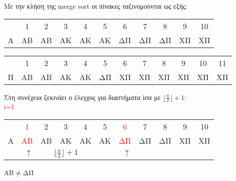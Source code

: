 \documentclass[a4paper]{article}
\begin{document}
\begin{itemize}
Με την κλήση της merge sort οι πίνακες ταξινομούνται ως εξής:
\begin{center}
\begin{tabular}{r|c|c|c|c|c|c|c|c|c|c|}
\multicolumn{1}{r}{} & \multicolumn{1}{c}{1} & \multicolumn{1}{c}{2} & \multicolumn{1}{c}{3} & \multicolumn{1}{c}{4} & \multicolumn{1}{c}{5} & \multicolumn{1}{c}{6} & \multicolumn{1}{c}{7} & \multicolumn{1}{c}{8} & \multicolumn{1}{c}{9} & \multicolumn{1}{c}{10}\\
\cline{2-11}
 Α& ΑΒ & ΑΒ & ΑΚ & ΑΚ & ΑΚ & ΔΠ & ΔΠ & ΔΠ & ΧΠ & ΧΠ\\
\cline{2-11}
\end{tabular}
\begin{tabular}{r|c|c|c|c|c|c|c|c|c|c|c|}
\multicolumn{1}{r}{} & \multicolumn{1}{c}{1} & \multicolumn{1}{c}{2} & \multicolumn{1}{c}{3} & \multicolumn{1}{c}{4} & \multicolumn{1}{c}{5} & \multicolumn{1}{c}{6} & \multicolumn{1}{c}{7} & \multicolumn{1}{c}{8} & \multicolumn{1}{c}{9} & \multicolumn{1}{c}{10} & \multicolumn{1}{c}{11}\\
\cline{2-12}
 Π& ΑΒ & ΑΒ & ΑΚ & ΑΚ & ΔΠ & ΧΠ & ΧΠ & ΧΠ & ΧΠ & ΧΠ & ΧΠ \\
\cline{2-12}
\end{tabular}
\end{center}


Στη συνέχεια ξεκινάει ο έλεγχος για διαστήματα ίσα με $\lfloor\frac{n}{2}\rfloor+1$:\\
\textcolor{red}{i=1}
\begin{center}
\begin{tabular}{r|c|c|c|c|c|c|c|c|c|c|}
\multicolumn{1}{r}{} & \multicolumn{1}{c}{\textcolor{red}{1}} & \multicolumn{1}{c}{2} & \multicolumn{1}{c}{3} & \multicolumn{1}{c}{4} & \multicolumn{1}{c}{5} & \multicolumn{1}{c}{\textcolor{red}{6}} & \multicolumn{1}{c}{7} & \multicolumn{1}{c}{8} & \multicolumn{1}{c}{9} & \multicolumn{1}{c}{10}\\
\cline{2-11}
 Α& \textcolor{red}{ΑΒ} & ΑΒ & ΑΚ & ΑΚ & ΑΚ & \textcolor{red}{ΔΠ} & ΔΠ & ΔΠ & ΧΠ & ΧΠ\\
\cline{2-11}
\multicolumn{2}{r}{$\uparrow$} & \multicolumn{3}{c}{$\lfloor\frac{n}{2}\rfloor+1$} & \multicolumn{2}{r}{$\uparrow$}\\
\cline{2-7}




     
\end{tabular}
\end{center}
ΑΒ$\neq$ΔΠ
\begin{center}
    

\end{center}
\end{itemize}
\end{document}
